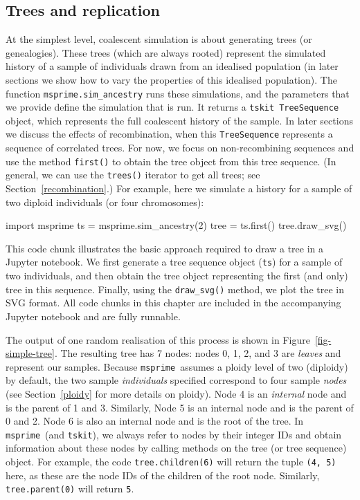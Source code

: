 \documentclass[graybox]{svmult}
\newcommand{\msprime}[0]{\texttt{msprime}}
\newcommand{\tskit}[0]{\texttt{tskit}}
\begin{document}
\subsection{Trees and replication}
At the simplest level, coalescent simulation is about generating trees (or genealogies).
These trees (which are always rooted) represent the simulated history of a sample of individuals
drawn from an idealised population (in later sections we show how to
vary the properties of this idealised population). The function
\texttt{msprime.sim\_ancestry} runs these simulations, and the parameters
that we provide define the simulation that is
run. It returns a \tskit\ \texttt{TreeSequence} object, which represents the
full coalescent history of the sample. In later sections we discuss the
effects of recombination, when this \texttt{TreeSequence} represents a
sequence of correlated trees. For now, we focus on non-recombining sequences and
use the method \texttt{first()} to obtain the
tree object from this tree sequence. (In general, we can use the \texttt{trees()} iterator
to get all trees; see Section~\ref{recombination}.)
For example, here we simulate a
history for a sample of two diploid individuals (or four chromosomes):

\begin{pythoncode}
import msprime
ts = msprime.sim_ancestry(2)
tree = ts.first()
tree.draw_svg()
\end{pythoncode}

This code chunk illustrates the basic approach required to draw a tree
in a Jupyter notebook. We first generate a tree sequence object (\texttt{ts}) for a sample of two individuals,
and then obtain the tree object representing the first (and only)
tree in this sequence. Finally, using the \texttt{draw\_svg()} method, we plot
the tree in SVG format.
All code chunks in this chapter are included in the accompanying Jupyter
notebook and are fully runnable.

The output of one random realisation of this process is shown in
Figure~\ref{fig-simple-tree}. The resulting tree has 7 nodes:
nodes 0, 1, 2, and 3 are \emph{leaves} and
represent our samples.
Because \msprime\ assumes a ploidy level of two (diploidy) by default,
the two sample \emph{individuals} specified correspond to four
sample \emph{nodes}
(see Section~\ref{ploidy} for more details on ploidy).
Node 4 is an \emph{internal} node and is the
parent of 1 and 3. Similarly, Node 5 is an internal node and is the
parent of 0 and 2. Node 6 is also an internal node and is the root of
the tree. In \msprime\ (and \tskit), we always refer to nodes by their integer IDs and
obtain information about these nodes by calling methods on the tree
(or tree sequence) object. For example, the code \texttt{tree.children(6)} will return the
tuple \texttt{(4,\ 5)} here, as these are the node IDs of the children
of the root node. Similarly, \texttt{tree.parent(0)} will return
\texttt{5}.
\end{document}
